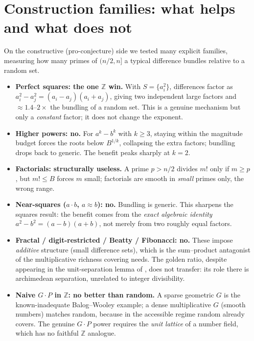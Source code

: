 \documentclass[11pt]{article}
\theoremstyle{definition}
\newcommand{\Z}{\mathbb{Z}}
\begin{document}
\section{Construction families: what helps and what does not}

On the constructive (pro-conjecture) side we tested many explicit families,
measuring how many primes of $(n/2,n]$ a typical difference bundles relative to a
random set.

\begin{itemize}
\item \textbf{Perfect squares: the one $\Z$ win.} With $S=\{a_i^2\}$, differences
factor as $a_i^2-a_j^2=(a_i-a_j)(a_i+a_j)$, giving two independent large factors and
$\approx 1.4$--$2\times$ the bundling of a random set. This is a genuine mechanism
but only a \emph{constant} factor; it does not change the exponent.
\item \textbf{Higher powers: no.} For $a^k-b^k$ with $k\ge 3$, staying within the
magnitude budget forces the roots below $B^{1/k}$, collapsing the extra factors;
bundling drops back to generic. The benefit peaks sharply at $k=2$.
\item \textbf{Factorials: structurally useless.} A prime $p>n/2$ divides $m!$ only
if $m\ge p$, but $m!\le B$ forces $m$ small; factorials are smooth in \emph{small}
primes only, the wrong range.
\item \textbf{Near-squares ($a\cdot b$, $a\approx b$): no.} Bundling is generic.
This sharpens the squares result: the benefit comes from the \emph{exact algebraic
identity} $a^2-b^2=(a-b)(a+b)$, not merely from two roughly equal factors.
\item \textbf{Fractal / digit-restricted / Beatty / Fibonacci: no.} These impose
\emph{additive} structure (small difference sets), which is the sum--product
antagonist of the multiplicative richness covering needs. The golden ratio, despite
appearing in the unit-separation lemma of \cite{BSSZ}, does not transfer: its role
there is archimedean separation, unrelated to integer divisibility.
\item \textbf{Naive $G\cdot P$ in $\Z$: no better than random.} A sparse geometric
$G$ is the known-inadequate Balog--Wooley example; a dense multiplicative $G$
(smooth numbers) matches random, because in the accessible regime random already
covers. The genuine $G\cdot P$ power requires the \emph{unit lattice} of a number
field, which has no faithful $\Z$ analogue.
\end{itemize}
\end{document}

